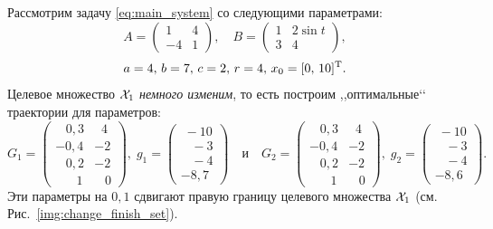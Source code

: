 Рассмотрим задачу \eqref{eq:main_system} со следующими параметрами:
$$
        A = \begin{pmatrix} 1 & 4 \\ -4 & 1 \end{pmatrix}, \quad
        B = \begin{pmatrix} 1 & 2\sin t \\ 3 & 4 \end{pmatrix},
$$
$$
        a = 4,\,b=7,\,c=2,\,r=4,\,x_0 = [0,\,10]^{\mathrm{T}}.
$$
Целевое множество $\mathcal{X}_1$ \textit{немного изменим}, то есть построим ,,оптимальные‘‘ траектории для параметров:
$$
        G_1 = \begin{pmatrix}
        \;\;\;0{,}3 & \;\;4\\
        -0{,}4 & -2 \\
        \;\;\;0{,}2 & -2 \\
        \;\;\;\;\;\;1 & \;\;\;0
        \end{pmatrix},\;
        g_1 = \begin{pmatrix}
                \;-10 \\
                \;\;\;-3 \\
                \;\;\;-4 \\
                -8{,}7
        \end{pmatrix}
        \quad
        \mbox{и}
        \quad
        G_2 = \begin{pmatrix}
        \;\;\;0{,}3 & \;\;4\\
        -0{,}4 & -2 \\
        \;\;\;0{,}2 & -2 \\
        \;\;\;\;\;\;1 & \;\;\;0
        \end{pmatrix},\;
        g_2 = \begin{pmatrix}
                \;-10 \\
                \;\;\;-3 \\
                \;\;\;-4 \\
                -8{,}6
        \end{pmatrix}.
        $$
Эти параметры на $0{,}1$ сдвигают правую границу целевого множества $\mathcal{X}_1$ (см. Рис.~\ref{img:change_finish_set}).

